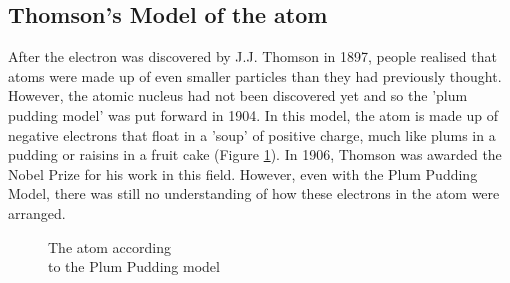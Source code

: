             \subsection*{Thomson's Model of the atom}
            \nopagebreak
\begin{minipage}{.5\textwidth}
        \label{m38756*id254616}After the electron was discovered by J.J. Thomson in 1897, people realised that atoms were made up of even smaller particles than they had previously thought. However, the atomic nucleus had not been discovered yet and so the 'plum pudding model' was put forward in 1904. In this model, the atom is made up of negative electrons that float in a 'soup' of positive charge, much like plums in a pudding or raisins in a fruit cake (Figure \ref{fig:atom:plumpudding}). In 1906, Thomson was awarded the Nobel Prize for his work in this field. However, even with the Plum Pudding Model, there was still no understanding of how these electrons in the atom were arranged.\par 
\end{minipage}
\begin{minipage}{.5\textwidth}
    \setcounter{subfigure}{0}
	\begin{figure}[H] %
    \begin{center}
\begin{minipage}{.8\textwidth}
\caption{The atom according \\ to the Plum Pudding model}
\end{minipage}
\label{fig:atom:plumpudding}
\end{center}
 \end{figure}    
\end{minipage}  
